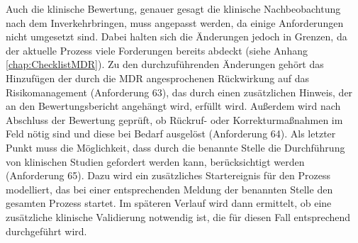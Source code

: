 \documentclass[a4paper,12pt]{report}
\begin{document}
Auch die klinische Bewertung, genauer gesagt die klinische Nachbeobachtung nach dem Inverkehrbringen, muss angepasst werden, da einige Anforderungen nicht umgesetzt sind. Dabei halten sich die Änderungen jedoch in Grenzen, da der aktuelle Prozess viele Forderungen bereits abdeckt (siehe Anhang \ref{chap:ChecklistMDR}). Zu den durchzuführenden Änderungen gehört das Hinzufügen der durch die MDR angesprochenen Rückwirkung auf das Risikomanagement (Anforderung 63), das durch einen zusätzlichen Hinweis, der an den Bewertungsbericht angehängt wird, erfüllt wird. Außerdem wird nach Abschluss der Bewertung geprüft, ob Rückruf- oder Korrekturmaßnahmen im Feld nötig sind und diese bei Bedarf ausgelöst (Anforderung 64). Als letzter Punkt muss die Möglichkeit, dass durch die benannte Stelle die Durchführung von klinischen Studien gefordert werden kann, berücksichtigt werden (Anforderung 65). Dazu wird ein zusätzliches Startereignis für den Prozess modelliert, das bei einer entsprechenden Meldung der benannten Stelle den gesamten Prozess startet. Im späteren Verlauf wird dann ermittelt, ob eine zusätzliche klinische Validierung notwendig ist, die für diesen Fall entsprechend durchgeführt wird.
\end{document}
